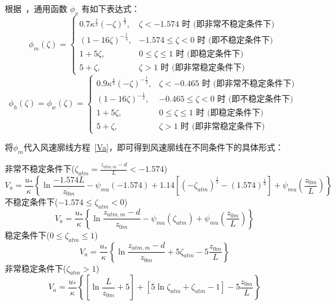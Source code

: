 根据~\citet{zeng1998intercomparison}，通用函数 $\phi_x$ 有如下表达式：
\begin{equation}\label{phim_zeng}
   \phi_{m}(\zeta)=\begin{cases}
     0.7 \kappa^{\frac{2}{3}}(-\zeta)^{\frac{1}{3}}, & \zeta<-1.574 \text { 时 (即非常不稳定条件下) } \\
     (1-16 \zeta)^{-\frac{1}{4}}, & -1.574 \leqslant \zeta<0 \text { 时 (即不稳定条件下) } \\
     1+5 \zeta, & 0 \leqslant \zeta \leqslant 1 \text { 时 (即稳定条件下) } \\ 
     5+\zeta, & \zeta>1 \text { 时 (即非常稳定条件下) }
   \end{cases}
\end{equation}
\begin{equation}
  \phi_{h}(\zeta)=\phi_{w}(\zeta)=\begin{cases}
     0.9 \kappa^{\frac{4}{3}}(-\zeta)^{-\frac{1}{3}}, & \zeta<-0.465 \text { 时 (即非常不稳定条件下) } \\ 
     (1-16 \zeta)^{-\frac{1}{2}}, & -0.465 \leqslant \zeta<0 \text { 时 (即不稳定条件下) } \\ 
     1+5 \zeta, & 0 \leqslant \zeta \leqslant 1 \text { 时 (即稳定条件下) } \\
     5+\zeta, & \zeta>1 \text { 时 (即非常稳定条件下) }
   \end{cases}
\end{equation}

将$\phi_m$代入风速廓线方程~\eqref{Va}，即可得到风速廓线在不同条件下的具体形式：

\noindent 非常不稳定条件下($\zeta_{atm}=\frac{z_{atm,m}-d}{L}<-1.574$)
\begin{equation}\label{Va_VU}
V_{a}=\frac{u_{*}}{\kappa}\left\{\ln \frac{-1.574 L}{z_{0 m}}-\psi_{mu}(-1.574)+
1.14\left[\left(-\zeta_{atm}\right)^{\frac{1}{3}}-(1.574)^{\frac{1}{3}}\right]+\psi_{mu}\left(\frac{z_{0 m}}{L}\right)\right\}
\end{equation}
不稳定条件下($-1.574\leqslant\zeta_{atm}<0$)
\begin{equation}\label{Va_U}
V_{a}=\frac{u_{*}}{\kappa}\left\{\ln \frac{z_{atm, m}-d}{z_{0 m}}-\psi_{mu}\left(\zeta_{atm}\right)+\psi_{mu}\left(\frac{z_{0 m}}{L}\right)\right\}
\end{equation}
稳定条件下($0\leqslant\zeta_{atm}\leqslant1$)
\begin{equation}\label{Va_S}
V_{a}=\frac{u_{*}}{\kappa}\left\{\ln \frac{z_{atm, m}-d}{z_{0 m}}+5 \zeta_{atm}-5 \frac{z_{0 m}}{L}\right\}
\end{equation}
非常稳定条件下($\zeta_{atm}>1$)
\begin{equation}\label{Va_VS}
V_{a}=\frac{u_{*}}{\kappa}\left\{\left[\ln \frac{L}{z_{0 m}}+5\right]+\left[5 \ln \zeta_{atm}+\zeta_{atm}-1\right]-5 \frac{z_{0 m}}{L}\right\}
\end{equation}

